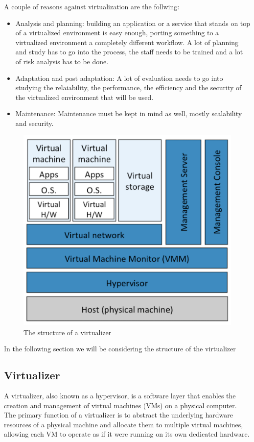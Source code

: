 A couple of reasons against virtualization are the follwing:
\begin{itemize}
    \item Analysis and planning: building an application or a service that stands on top of a virtualized environment is easy enough, porting something to a virtualized environment a completely different workflow. A lot of planning and study has to go into the process, the staff needs to be trained and a lot of risk analysis has to be done.
    \item Adaptation and post adaptation: A lot of evaluation needs to go into studying the relaiability, the performance, the efficiency and the security of the virtualized environment that will be used.
    \item Maintenance: Maintenance must be kept in mind as well, mostly scalability and security.
\end{itemize}
\begin{figure}
    \centering
    \includegraphics[scale=0.4]{img/virtualization_components.png}
    \caption{The structure of a virtualizer}
\end{figure}
In the following section we will be considering the structure of the virtualizer
\subsection{Virtualizer}
A virtualizer, also known as a hypervisor, is a software layer that enables the creation and management of virtual machines (VMs) on a physical computer. The primary function of a virtualizer is to abstract the underlying hardware resources of a physical machine and allocate them to multiple virtual machines, allowing each VM to operate as if it were running on its own dedicated hardware.

